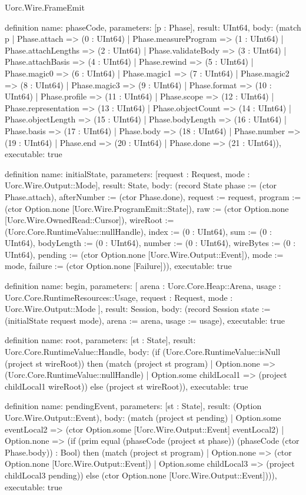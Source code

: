 \begin{lexlean}{Uorc.Wire.FrameEmit}
\begin{semanticmodule}
definition{
  name: phaseCode,
  parameters: [p : Phase],
  result: UInt64,
  body: (match p
    | Phase.attach => (0 : UInt64)
    | Phase.measureProgram => (1 : UInt64)
    | Phase.attachLengths => (2 : UInt64)
    | Phase.validateBody => (3 : UInt64)
    | Phase.attachBasis => (4 : UInt64)
    | Phase.rewind => (5 : UInt64)
    | Phase.magic0 => (6 : UInt64)
    | Phase.magic1 => (7 : UInt64)
    | Phase.magic2 => (8 : UInt64)
    | Phase.magic3 => (9 : UInt64)
    | Phase.format => (10 : UInt64)
    | Phase.profile => (11 : UInt64)
    | Phase.scope => (12 : UInt64)
    | Phase.representation => (13 : UInt64)
    | Phase.objectCount => (14 : UInt64)
    | Phase.objectLength => (15 : UInt64)
    | Phase.bodyLength => (16 : UInt64)
    | Phase.basis => (17 : UInt64)
    | Phase.body => (18 : UInt64)
    | Phase.number => (19 : UInt64)
    | Phase.end => (20 : UInt64)
    | Phase.done => (21 : UInt64)),
  executable: true
}

definition{
  name: initialState,
  parameters: [request : Request, mode : Uorc.Wire.Output::Mode],
  result: State,
  body: (record State {phase := (ctor Phase.attach), afterNumber := (ctor Phase.done), request := request, program := (ctor Option.none [Uorc.Wire.ProgramEmit::State]), raw := (ctor Option.none [Uorc.Wire.OwnedRead::Cursor]), wireRoot := (Uorc.Core.RuntimeValue::nullHandle), index := (0 : UInt64), sum := (0 : UInt64), bodyLength := (0 : UInt64), number := (0 : UInt64), wireBytes := (0 : UInt64), pending := (ctor Option.none [Uorc.Wire.Output::Event]), mode := mode, failure := (ctor Option.none [Failure])}),
  executable: true
}

definition{
  name: begin,
  parameters: [
    arena : Uorc.Core.Heap::Arena,
    usage : Uorc.Core.RuntimeResources::Usage,
    request : Request,
    mode : Uorc.Wire.Output::Mode
  ],
  result: Session,
  body: (record Session {state := (initialState request mode), arena := arena, usage := usage}),
  executable: true
}

definition{
  name: root,
  parameters: [st : State],
  result: Uorc.Core.RuntimeValue::Handle,
  body: (if (Uorc.Core.RuntimeValue::isNull (project st wireRoot)) then (match (project st program)
    | Option.none => (Uorc.Core.RuntimeValue::nullHandle)
    | Option.some childLocal1 => (project childLocal1 wireRoot)) else (project st wireRoot)),
  executable: true
}

definition{
  name: pendingEvent,
  parameters: [st : State],
  result: (Option Uorc.Wire.Output::Event),
  body: (match (project st pending)
    | Option.some eventLocal2 => (ctor Option.some [Uorc.Wire.Output::Event] eventLocal2)
    | Option.none => (if (prim equal (phaseCode (project st phase)) (phaseCode (ctor Phase.body)) : Bool) then (match (project st program)
      | Option.none => (ctor Option.none [Uorc.Wire.Output::Event])
      | Option.some childLocal3 => (project childLocal3 pending)) else (ctor Option.none [Uorc.Wire.Output::Event]))),
  executable: true
}


\end{semanticmodule}
\end{lexlean}
